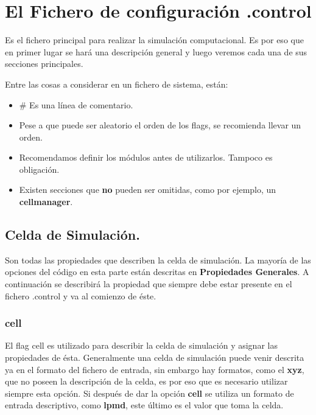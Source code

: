 \section{El Fichero de configuraci\'on .control}

Es el fichero principal para realizar la simulaci\'on computacional. Es por eso que en primer lugar se har\'a una descripci\'on general y luego veremos cada una de sus secciones principales.

Entre las cosas a considerar en un fichero de sistema, est\'an:

\begin{itemize}
 \item \# Es una l\'inea de comentario.
 \item Pese a que puede ser aleatorio el orden de los flags, se recomienda llevar un orden.
 \item Recomendamos definir los m\'odulos antes de utilizarlos. Tampoco es obligaci\'on.
 \item Existen secciones que \textbf{no} pueden ser omitidas, como por ejemplo, un \textbf{cellmanager}.
\end{itemize}

\subsection{Celda de Simulaci\'on.}

Son todas las propiedades que describen la celda de simulaci\'on. La mayor\'ia de las opciones del c\'odigo en esta parte est\'an descritas en \textbf{Propiedades Generales}. A continuaci\'on se describir\'a la propiedad que siempre debe estar presente en el fichero .control y va al comienzo de \'este.

\subsubsection{cell}

El flag cell es utilizado para describir la celda de simulaci\'on y asignar las propiedades de \'esta. Generalmente una celda de simulaci\'on puede venir descrita ya en el formato del fichero de entrada, sin embargo hay formatos, como el \textbf{xyz}, que no poseen la descripci\'on de la celda, es por eso que es necesario utilizar siempre esta opci\'on. Si despu\'es de dar la opci\'on \textbf{cell} se utiliza un formato de entrada descriptivo, como \textbf{lpmd}, este \'ultimo es el valor que toma la celda.


